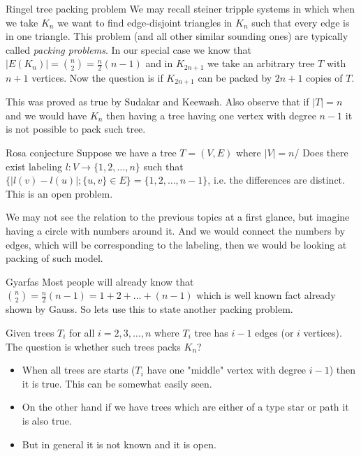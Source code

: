 \begin{topic}{Ringel tree packing problem}
	We may recall steiner tripple systems in which when we take $K_n$ we want to find edge-disjoint triangles in $K_n$ such that every edge is in one triangle. This problem (and all other similar sounding ones) are typically called \textit{packing problems}. In our special case we know that $|E(K_n)| = \binom{n}{2} = \frac{n}{2} (n-1)$ and in $K_{2n+1}$ we take an arbitrary tree $T$ with $n+1$ vertices. Now the question is if $K_{2n+1}$ can be packed by $2n+1$ copies of $T$.
	
	This was proved as true by Sudakar and Keewash. Also observe that if $|T| = n$ and we would have $K_n$ then having a tree having one vertex with degree $n-1$ it is not possible to pack such tree.
\end{topic}

\begin{topic}{Rosa conjecture}
	Suppose we have a tree $T = (V,E)$ where $|V| = n$/ Does there exist labeling $l : V \to \{1,2, \dots, n\}$ such that $\{|l(v) - l(u)|; \{u,v\} \in E\} = \{1,2, \dots, n-1\}$, i.e. the differences are distinct. This is an \OPEN open problem.
	
	We may not see the relation to the previous topics at a first glance, but imagine having a circle with numbers around it. And we would connect the numbers by edges, which will be corresponding to the labeling, then we would be looking at packing of such model.
\end{topic}

\begin{topic}{Gyarfas}
	Most people will already know that $\binom{n}{2} = \frac{n}{2} (n-1) = 1 + 2 + \dots + (n-1)$ which is well known fact already shown by Gauss. So lets use this to state another packing problem.
	
	Given trees $T_i$ for all $i = 2,3, \dots, n$ where $T_i$ tree has $i-1$ edges (or $i$ vertices). The question is whether such trees packs $K_n$?
	
	\begin{itemize}
		\item When all trees are starts ($T_i$ have one "middle" vertex with degree $i-1$) then it is true. This can be somewhat easily seen.
		\item On the other hand if we have trees which are either of a type star or path it is also true.
		\item But in general it is not known and it is \OPEN open.
	\end{itemize}
\end{topic}


